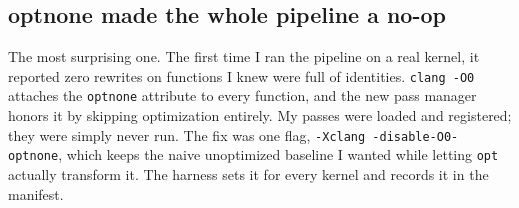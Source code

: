 \subsection{optnone made the whole pipeline a no-op}

The most surprising one. The first time I ran the pipeline on a real kernel, it
reported zero rewrites on functions I knew were full of identities.
\texttt{clang -O0} attaches the \texttt{optnone} attribute to every function, and
the new pass manager honors it by skipping optimization entirely. My passes were
loaded and registered; they were simply never run. The fix was one flag,
\texttt{-Xclang -disable-O0-optnone}, which keeps the naive unoptimized baseline
I wanted while letting \texttt{opt} actually transform it. The harness sets it for
every kernel and records it in the manifest.
